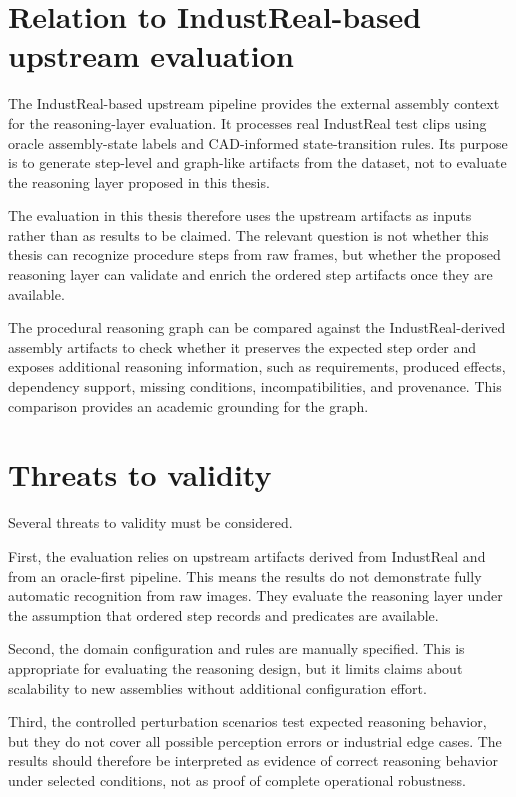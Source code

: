 \section{Relation to IndustReal-based upstream evaluation}
\label{sec:evaluation-industreal-relation}

The IndustReal-based upstream pipeline provides the external assembly context for the reasoning-layer evaluation. It processes real IndustReal test clips using oracle assembly-state labels and CAD-informed state-transition rules. Its purpose is to generate step-level and graph-like artifacts from the dataset, not to evaluate the reasoning layer proposed in this thesis.

The evaluation in this thesis therefore uses the upstream artifacts as inputs rather than as results to be claimed. The relevant question is not whether this thesis can recognize procedure steps from raw frames, but whether the proposed reasoning layer can validate and enrich the ordered step artifacts once they are available.

The procedural reasoning graph can be compared against the IndustReal-derived assembly artifacts to check whether it preserves the expected step order and exposes additional reasoning information, such as requirements, produced effects, dependency support, missing conditions, incompatibilities, and provenance. This comparison provides an academic grounding for the graph.

\section{Threats to validity}
\label{sec:evaluation-threats-validity}

Several threats to validity must be considered.

First, the evaluation relies on upstream artifacts derived from IndustReal and from an oracle-first pipeline. This means the results do not demonstrate fully automatic recognition from raw images. They evaluate the reasoning layer under the assumption that ordered step records and predicates are available.

Second, the domain configuration and rules are manually specified. This is appropriate for evaluating the reasoning design, but it limits claims about scalability to new assemblies without additional configuration effort.

Third, the controlled perturbation scenarios test expected reasoning behavior, but they do not cover all possible perception errors or industrial edge cases. The results should therefore be interpreted as evidence of correct reasoning behavior under selected conditions, not as proof of complete operational robustness.

